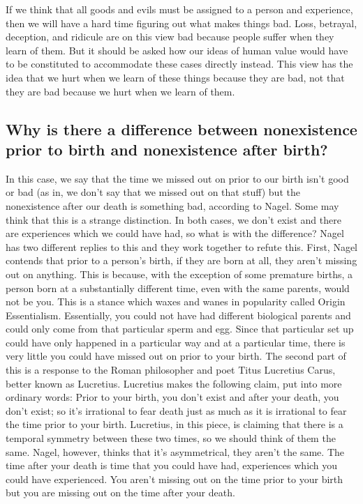 If we think that all goods and evils must be assigned to a person and experience, then we will have a hard time figuring out what makes things bad. Loss, betrayal, deception, and ridicule are on this view bad because people suffer when they learn of them. But it should be asked how our ideas of human value would have to be constituted to accommodate these cases directly instead. This view has the idea that we hurt when we learn of these things because they are bad, not that they are bad because we hurt when we learn of them.

\subsection{Why is there a difference between nonexistence prior to birth and nonexistence after birth?}

In this case, we say that the time we missed out on prior to our birth isn't good or bad (as in, we don't say that we missed out on that stuff) but the nonexistence after our death is something bad, according to Nagel. Some may think that this is a strange distinction. In both cases, we don't exist and there are experiences which we could have had, so what is with the difference? Nagel has two different replies to this and they work together to refute this. First, Nagel contends that prior to a person's birth, if they are born at all, they aren't missing out on anything. This is because, with the exception of some premature births, a person born at a substantially different time, even with the same parents, would not be you. This is a stance which waxes and wanes in popularity called Origin Essentialism. Essentially, you could not have had different biological parents and could only come from that particular sperm and egg. Since that particular set up could have only happened in a particular way and at a particular time, there is very little you could have missed out on prior to your birth. The second part of this is a response to the Roman philosopher and poet Titus Lucretius Carus, better known as Lucretius. Lucretius makes the following claim, put into more ordinary words: Prior to your birth, you don't exist and after your death, you don't exist; so it's irrational to fear death just as much as it is irrational to fear the time prior to your birth. Lucretius, in this piece, is claiming that there is a temporal symmetry between these two times, so we should think of them the same. Nagel, however, thinks that it's asymmetrical, they aren't the same. The time after your death is time that you could have had, experiences which you could have experienced. You aren't missing out on the time prior to your birth but you are missing out on the time after your death.